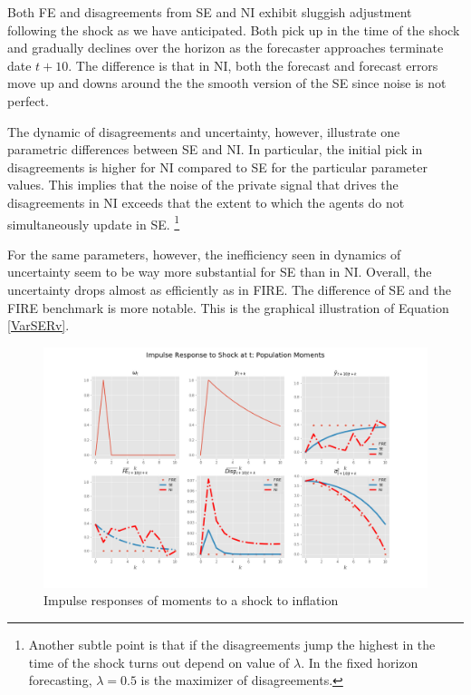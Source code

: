 \documentclass[]{article}
\begin{document}
	
	Both FE and disagreements from SE and NI exhibit sluggish adjustment following the shock as we have anticipated. Both pick up in the time of the shock and gradually declines over the horizon as the forecaster approaches terminate date $t+10$. The difference is that in NI, both the forecast and forecast errors move up and downs around the the smooth version of the SE since noise is not perfect. 
	
	The dynamic of disagreements and uncertainty, however,  illustrate one parametric differences between SE and NI. In particular,  the initial pick in disagreements is higher for NI compared to SE for the particular parameter values. This implies that the noise of the private signal that drives the disagreements in NI exceeds that the extent to which the agents do not simultaneously update in SE. \footnote{Another subtle point is that if the disagreements jump the highest in the time of the shock turns out depend on value of $\lambda$. In the fixed horizon forecasting, $\lambda=0.5$ is the maximizer of disagreements.}
	
	For the same parameters, however, the inefficiency seen in dynamics of uncertainty seem to be way more substantial for SE than in NI. Overall, the uncertainty drops almost as efficiently as in FIRE. The difference of SE and the FIRE benchmark is more notable. This is the graphical illustration of Equation \ref{VarSERv}. 
	
	
	\begin{figure}[ht]
		\centering
		\includegraphics[width=16cm]{figures/ir_popseni.png} 
		\caption{Impulse responses of moments to a shock to inflation}
		\label{ir_pop}
	\end{figure}
	
	
	
\end{document}
